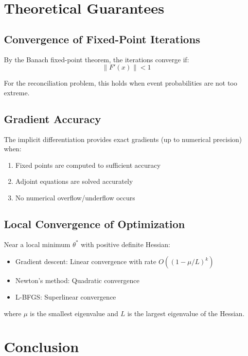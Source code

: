 \documentclass[11pt]{article}
\theoremstyle{definition}
\begin{document}
\section{Theoretical Guarantees}

\subsection{Convergence of Fixed-Point Iterations}

By the Banach fixed-point theorem, the iterations converge if:
\begin{equation}
    \|F'(x)\| < 1
\end{equation}

For the reconciliation problem, this holds when event probabilities are not too extreme.

\subsection{Gradient Accuracy}

The implicit differentiation provides exact gradients (up to numerical precision) when:
\begin{enumerate}
    \item Fixed points are computed to sufficient accuracy
    \item Adjoint equations are solved accurately
    \item No numerical overflow/underflow occurs
\end{enumerate}

\subsection{Local Convergence of Optimization}

Near a local minimum $\theta^*$ with positive definite Hessian:
\begin{itemize}
    \item Gradient descent: Linear convergence with rate $O((1-\mu/L)^k)$
    \item Newton's method: Quadratic convergence
    \item L-BFGS: Superlinear convergence
\end{itemize}

where $\mu$ is the smallest eigenvalue and $L$ is the largest eigenvalue of the Hessian.

\section{Conclusion}
\end{document}
